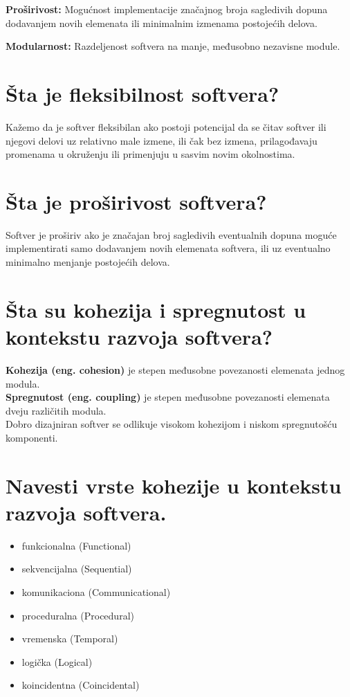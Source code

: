 \documentclass[a4paper]{article}
\begin{document}
  \textbf{Proširivost:} Mogućnost implementacije značajnog broja sagledivih dopuna dodavanjem novih elemenata ili minimalnim izmenama postojećih delova.

  \textbf{Modularnost:} Razdeljenost softvera na manje, međusobno nezavisne module.

\section{Šta je fleksibilnost softvera?}
Kažemo da je softver fleksibilan ako postoji potencijal da se čitav softver ili njegovi delovi uz relativno male izmene, ili čak bez izmena, prilagođavaju promenama u okruženju ili primenjuju u sasvim novim okolnostima.\\

\section{Šta je proširivost softvera?}
Softver je proširiv ako je značajan broj sagledivih eventualnih dopuna moguće implementirati samo dodavanjem novih elemenata softvera, ili uz eventualno minimalno menjanje postojećih delova.

\section{Šta su kohezija i spregnutost u kontekstu razvoja softvera?}
  \textbf{Kohezija (eng. cohesion)} je stepen međusobne povezanosti elemenata jednog modula.\\

  \textbf{Spregnutost (eng. coupling)} je stepen međusobne povezanosti elemenata dveju različitih
  modula. \\

  Dobro dizajniran softver se odlikuje visokom kohezijom i niskom spregnutošću komponenti.
  \cite{gfg_coupling_and_cohesion}
  \cite{sjsu_coupling_and_cohesion}

\section{Navesti vrste kohezije u kontekstu razvoja softvera.}
  \begin{itemize}
    \item funkcionalna (Functional)
    \item sekvencijalna (Sequential)
    \item komunikaciona (Communicational)
    \item proceduralna (Procedural)
    \item vremenska (Temporal)
    \item logička (Logical)
    \item koincidentna (Coincidental)
  \end{itemize}
 
\end{document}
